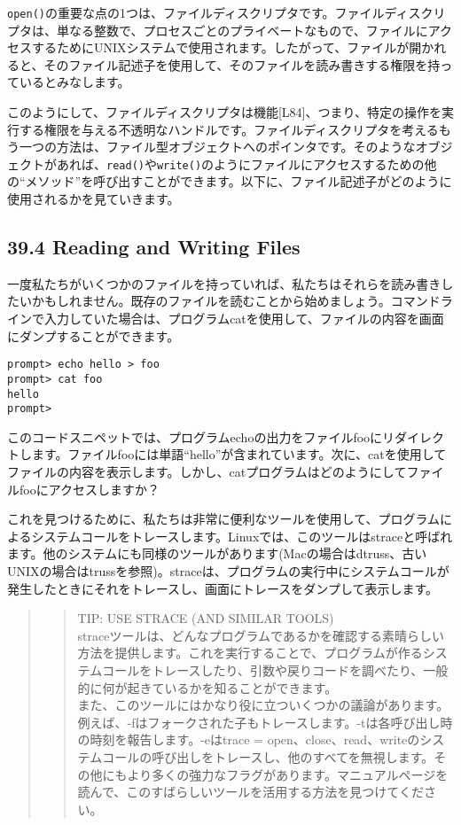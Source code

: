 \texttt{open()}の重要な点の1つは、ファイルディスクリプタです。ファイルディスクリプタは、単なる整数で、プロセスごとのプライベートなもので、ファイルにアクセスするためにUNIXシステムで使用されます。したがって、ファイルが開かれると、そのファイル記述子を使用して、そのファイルを読み書きする権限を持っているとみなします。

このようにして、ファイルディスクリプタは機能{[}L84{]}、つまり、特定の操作を実行する権限を与える不透明なハンドルです。ファイルディスクリプタを考えるもう一つの方法は、ファイル型オブジェクトへのポインタです。そのようなオブジェクトがあれば、\texttt{read()}や\texttt{write()}のようにファイルにアクセスするための他の``メソッド''を呼び出すことができます。以下に、ファイル記述子がどのように使用されるかを見ていきます。

\hypertarget{reading-and-writing-files}{%
\subsection*{39.4 Reading and Writing
Files}\label{reading-and-writing-files}}

一度私たちがいくつかのファイルを持っていれば、私たちはそれらを読み書きしたいかもしれません。既存のファイルを読むことから始めましょう。コマンドラインで入力していた場合は、プログラムcatを使用して、ファイルの内容を画面にダンプすることができます。

\begin{verbatim}
prompt> echo hello > foo
prompt> cat foo
hello
prompt>
\end{verbatim}

このコードスニペットでは、プログラムechoの出力をファイルfooにリダイレクトします。ファイルfooには単語``hello''が含まれています。次に、catを使用してファイルの内容を表示します。しかし、catプログラムはどのようにしてファイルfooにアクセスしますか？

これを見つけるために、私たちは非常に便利なツールを使用して、プログラムによるシステムコールをトレースします。Linuxでは、このツールはstraceと呼ばれます。他のシステムにも同様のツールがあります(Macの場合はdtruss、古いUNIXの場合はtrussを参照)。straceは、プログラムの実行中にシステムコールが発生したときにそれをトレースし、画面にトレースをダンプして表示します。

\begin{quote}
\begin{quote}
TIP: USE STRACE (AND SIMILAR TOOLS)\\
straceツールは、どんなプログラムであるかを確認する素晴らしい方法を提供します。これを実行することで、プログラムが作るシステムコールをトレースしたり、引数や戻りコードを調べたり、一般的に何が起きているかを知ることができます。\\
また、このツールにはかなり役に立ついくつかの議論があります。例えば、-fはフォークされた子もトレースします。-tは各呼び出し時の時刻を報告します。-eはtrace
=
open、close、read、writeのシステムコールの呼び出しをトレースし、他のすべてを無視します。その他にもより多くの強力なフラグがあります。マニュアルページを読んで、このすばらしいツールを活用する方法を見つけてください。
\end{quote}
\end{quote}

